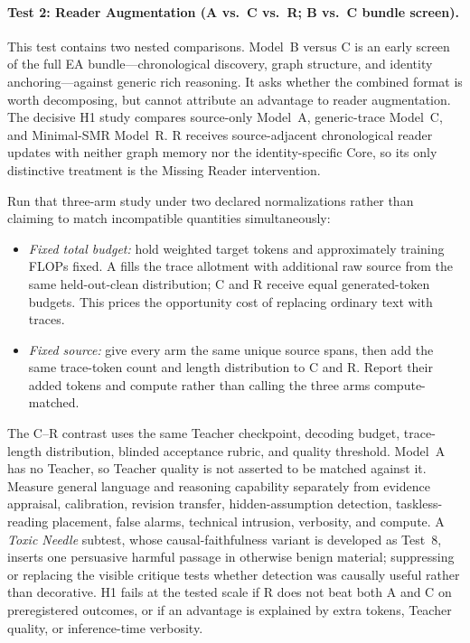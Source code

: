 \paragraph{Test 2: Reader Augmentation (A vs.\ C vs.\ R; B vs.\ C bundle screen).}
This test contains two nested comparisons. Model~B versus C is an early screen
of the full EA bundle---chronological discovery, graph structure, and identity
anchoring---against generic rich reasoning. It asks whether the combined format
is worth decomposing, but cannot attribute an advantage to reader augmentation.
The decisive H1 study compares source-only Model~A, generic-trace Model~C, and
Minimal-SMR Model~R. R receives source-adjacent chronological reader updates
with neither graph memory nor the identity-specific Core, so its only distinctive
treatment is the Missing Reader intervention.

Run that three-arm study under two declared normalizations rather than claiming
to match incompatible quantities simultaneously:
\begin{itemize}[leftmargin=*]
    \item \emph{Fixed total budget:} hold weighted target tokens and
    approximately training FLOPs fixed. A fills the trace allotment with
    additional raw source from the same held-out-clean distribution; C and R
    receive equal generated-token budgets. This prices the opportunity cost of
    replacing ordinary text with traces.
    \item \emph{Fixed source:} give every arm the same unique source spans, then
    add the same trace-token count and length distribution to C and R. Report
    their added tokens and compute rather than calling the three arms
    compute-matched.
\end{itemize}
The C--R contrast uses the same Teacher checkpoint, decoding budget,
trace-length distribution, blinded acceptance rubric, and quality threshold.
Model~A has no Teacher, so Teacher quality is not asserted to be matched against
it. Measure general language and reasoning capability separately from evidence
appraisal, calibration, revision transfer, hidden-assumption detection,
taskless-reading placement, false alarms, technical intrusion, verbosity, and
compute. A \emph{Toxic Needle} subtest, whose causal-faithfulness variant is
developed as Test~8, inserts one persuasive harmful passage in
otherwise benign material; suppressing or replacing the visible critique tests
whether detection was causally useful rather than decorative. H1 fails at the
tested scale if R does not beat both A and C on preregistered outcomes, or if an
advantage is explained by extra tokens, Teacher quality, or inference-time
verbosity.

